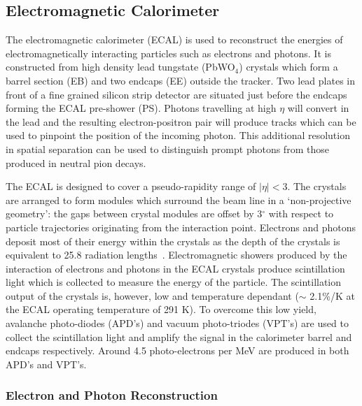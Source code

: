 \subsection{Electromagnetic Calorimeter}
The electromagnetic calorimeter (ECAL) is used to reconstruct the energies of electromagnetically 
interacting particles such as electrons and photons. 
It is constructed from high density lead tungstate (PbWO$_{4}$) crystals which
form a barrel section (EB) and two endcaps (EE) outside the tracker. 
Two lead plates in front of a fine grained silicon strip detector are situated just before the 
endcaps forming the ECAL pre-shower (PS). 
Photons travelling at high $\eta$ will convert in the lead and the resulting electron-positron pair
will produce tracks which can be used to pinpoint the position of the incoming photon. This additional
resolution in spatial separation can be used to distinguish prompt photons from those produced
in neutral pion decays.

The ECAL is designed to cover a pseudo-rapidity range of $|\eta | < 3$. 
The crystals are arranged to form modules which surround the beam line in a `non-projective geometry':
the gaps between crystal modules are offset by 3$^{\circ}$ with respect to particle trajectories originating from 
the interaction point. Electrons and photons deposit most of their energy within 
the crystals as the depth of the crystals is equivalent to 25.8 radiation lengths~\cite{TDR1}. 
Electromagnetic showers produced by the interaction of electrons and photons in the ECAL crystals
produce scintillation light which is collected to measure the energy of the particle. 
The scintillation output of the crystals is, however, low and temperature dependant 
($\sim$ 2.1\%/K at the ECAL operating temperature of 291 K). 
To overcome this low yield, avalanche photo-diodes (APD's) and vacuum 
photo-triodes (VPT's) are used to collect the scintillation light and amplify the signal in the 
calorimeter barrel and endcaps respectively. Around 4.5 photo-electrons per MeV are produced in both 
APD's and VPT's. 

\subsubsection{Electron and Photon Reconstruction}


